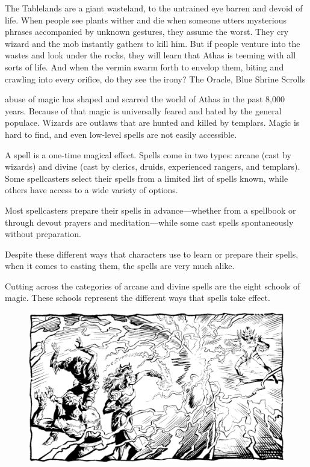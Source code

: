 {The Tablelands are a giant wasteland, to the untrained eye barren and devoid of life. When people see plants wither and die when someone utters mysterious phrases accompanied by unknown gestures, they assume the worst. They cry wizard and the mob instantly gathers to kill him. But if people venture into the wastes and look under the rocks, they will learn that Athas is teeming with all sorts of life. And when the vermin swarm forth to envelop them, biting and crawling into every orifice, do they see the irony?}
{The Oracle, Blue Shrine Scrolls}

 abuse of magic has shaped and scarred the world of Athas in the past 8,000 years. Because of that magic is universally feared and hated by the general populace. Wizards are outlaws that are hunted and killed by templars. Magic is hard to find, and even low-level spells are not easily accessible.

A spell is a one-time magical effect. Spells come in two types: arcane (cast by wizards) and divine (cast by clerics, druids, experienced rangers, and templars). Some spellcasters select their spells from a limited list of spells known, while others have access to a wide variety of options.

Most spellcasters prepare their spells in advance---whether from a spellbook or through devout prayers and meditation---while some cast spells spontaneously without preparation.

Despite these different ways that characters use to learn or prepare their spells, when it comes to casting them, the spells are very much alike.

Cutting across the categories of arcane and divine spells are the eight schools of magic. These schools represent the different ways that spells take effect.

\begin{figure}[t!]
\centering
\includegraphics[width=\textwidth]{images/magic-1.png}
\WOTC
\end{figure}






